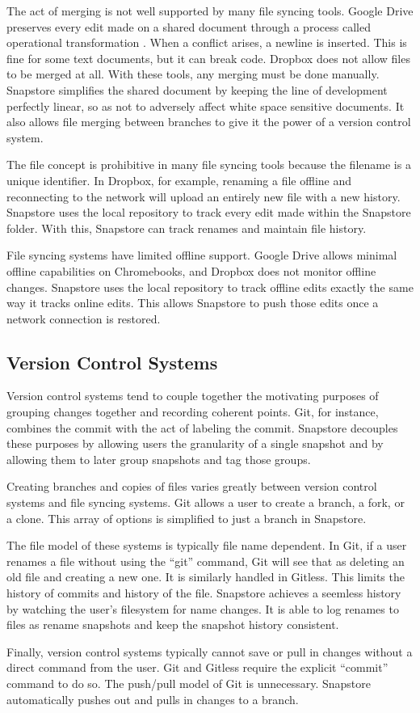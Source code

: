 The act of merging is not well supported by many file syncing tools. Google Drive preserves every edit made on a shared document through a process called operational transformation \cite{Xu}. When a conflict arises, a newline is inserted. This is fine for some text documents, but it can break code. Dropbox does not allow files to be merged at all. With these tools, any merging must be done manually. Snapstore simplifies the shared document by keeping the line of development perfectly linear, so as not to adversely affect white space sensitive documents. It also allows file merging between branches to give it the power of a version control system.

The file concept is prohibitive in many file syncing tools because the filename is a unique identifier. In Dropbox, for example, renaming a file offline and reconnecting to the network will upload an entirely new file with a new history. Snapstore uses the local repository to track every edit made within the Snapstore folder. With this, Snapstore can track renames and maintain file history.

File syncing systems have limited offline support. Google Drive allows minimal offline capabilities on Chromebooks, and Dropbox does not monitor offline changes. Snapstore uses the local repository to track offline edits exactly the same way it tracks online edits. This allows Snapstore to push those edits once a network connection is restored.

\subsection{Version Control Systems}

Version control systems tend to couple together the motivating purposes of grouping changes together and recording coherent points. Git, for instance, combines the commit with the act of labeling the commit. Snapstore decouples these purposes by allowing users the granularity of a single snapshot and by allowing them to later group snapshots and tag those groups.

Creating branches and copies of files varies greatly between version control systems and file syncing systems. Git allows a user to create a branch, a fork, or a clone. This array of options is simplified to just a branch in Snapstore. 

The file model of these systems is typically file name dependent. In Git, if a user renames a file without using the ``git'' command, Git will see that as deleting an old file and creating a new one. It is similarly handled in Gitless. This limits the history of commits and history of the file. Snapstore achieves a seemless history by watching the user's filesystem for name changes. It is able to log renames to files as rename snapshots and keep the snapshot history consistent.

Finally, version control systems typically cannot save or pull in changes without a direct command from the user. Git and Gitless require the explicit ``commit'' command to do so. The push/pull model of Git is unnecessary. Snapstore automatically pushes out and pulls in changes to a branch.




